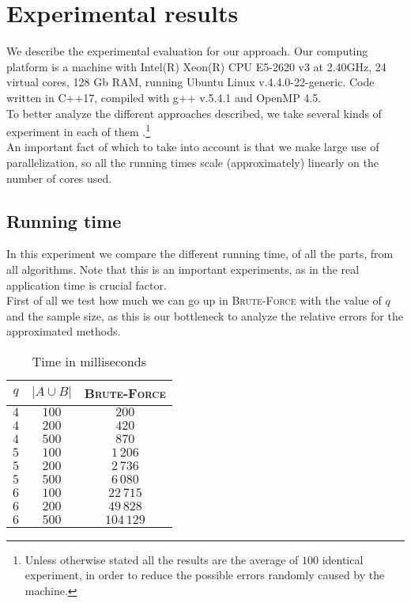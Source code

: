     \section{Experimental results}

    We describe the experimental evaluation for our approach. Our computing platform is a machine with Intel(R) Xeon(R) CPU E5-2620 v3 at 2.40GHz, 24 virtual cores, 128 Gb RAM, running Ubuntu Linux v.4.4.0-22-generic. Code written in C++17, compiled with g++ v.5.4.1 and OpenMP 4.5.\\
    
    To better analyze the different approaches described, we take several kinds of experiment in each of them .\footnote{Unless otherwise stated all the results are the average of $100$ identical experiment, in order to reduce the possible errors randomly caused by the machine.}\\
     
    An important fact of which to take into account is that we make large use of parallelization, 
    so all the running times scale (approximately) linearly on the number of cores used.
    
	\subsection*{Running time}
	
	In this experiment we compare the different running time, of all the parts, from all algorithms. Note that this is an important experiments, as in the real application time is crucial factor.\\

	First of all we test how much we can go up in \textsc{Brute-Force} with the value of $q$ and the sample size, as this is our bottleneck to analyze the relative errors for the approximated methods.\\ 
	
	\begin{table}[h]
		\centering
		\label{my-label}
		\begin{tabular}{|c|c|c|}
			\hline
			$q$ & $|A \cup B|$ & \textsc{Brute-Force} \\ \hline
			$4$ & $100$        & $200$ \\ \hline
			$4$ & $200$        & $420$ \\ \hline
			$4$ & $500$        & $870$ \\ \hline
			$5$ & $100$        & $1\,206$ \\ \hline
			$5$ & $200$        & $2\,736$ \\ \hline
			$5$ & $500$        & $6\,080$ \\ \hline
			$6$ & $100$        & $22\,715$ \\ \hline
			$6$ & $200$        & $49\,828$ \\ \hline
			$6$ & $500$        & $104\,129$ \\ \hline
		\end{tabular}
		\caption{Time in milliseconds}
	\end{table}
	
